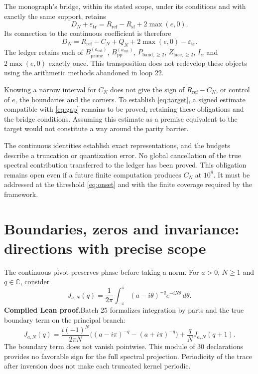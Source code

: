 \documentclass[11pt,a4paper]{article}
\theoremstyle{remark}
\newcommand{\C}{\mathbb C}
\newcommand{\paid}{\textbf{Compiled Lean proof.}\space}
\begin{document}
The monograph's bridge, within its stated scope, under its conditions and with exactly
the same support, retains
\begin{equation}\label{eq:ledger}
D_N+\varepsilon_{\mathrm{tr}}
=R_{\mathrm{ref}}-R_{\mathrm{sf}}+2\max(e,0).
\end{equation}
Its connection to the continuous coefficient is therefore
\begin{equation}\label{eq:gap}
D_N=R_{\mathrm{ref}}-C_N+Q_N+2\max(e,0)-\varepsilon_{\mathrm{tr}}.
\end{equation}
The ledger retains each of
$B_{\mathrm{prime}}^{(a_{\mathrm{cut}})}$,
$B_{\mathrm{pp}}^{(a_{\mathrm{cut}})}$,
$P_{\mathrm{band},\ge2}$, $Z_{\mathrm{face},\ge2}$, $I_\alpha$ and
$2\max(e,0)$ exactly once. This transposition does not redevelop these objects
using the arithmetic methods abandoned in loop 22.

Knowing a narrow interval for $C_N$ does not give the sign
of $R_{\mathrm{ref}}-C_N$, or control of $e$, the boundaries and the corners.
To establish \eqref{eq:target}, a signed estimate
compatible with \eqref{eq:gap} remains to be proved, retaining these obligations and the
bridge conditions. Assuming this estimate as a premise equivalent to
the target would not constitute a way around the parity barrier.

The continuous identities establish exact representations, and the
budgets describe a truncation or quantization error. No
global cancellation of the true spectral contribution transferred to the
ledger has been proved. This obligation remains open even if a future
finite computation produces $C_N$ at $10^8$. It must be addressed at the
threshold \eqref{eq:onset} and with the finite coverage required by the framework.

\clearpage
\section{Boundaries, zeros and invariance: directions with precise scope}\label{sec:strategy}
The continuous pivot preserves phase before taking a norm. For
$a>0$, $N\ge1$ and $q\in\C$, consider
\[
J_{a,N}(q)=\frac1{2\pi}\int_{-\pi}^{\pi}
(a-i\theta)^{-q}e^{-iN\theta}\,d\theta.
\]
\paid Batch 25 formalizes integration by parts and the true boundary term
on the principal branch:
\begin{equation}\label{eq:bord}
J_{a,N}(q)=\frac{i(-1)^N}{2\pi N}
\bigl((a-i\pi)^{-q}-(a+i\pi)^{-q}\bigr)
+\frac qN J_{a,N}(q+1).
\end{equation}
The boundary term does not vanish pointwise. This module of 30 declarations
provides no favorable sign for the full spectral projection.
Periodicity of the trace after inversion does not make
each truncated kernel periodic.
\end{document}

